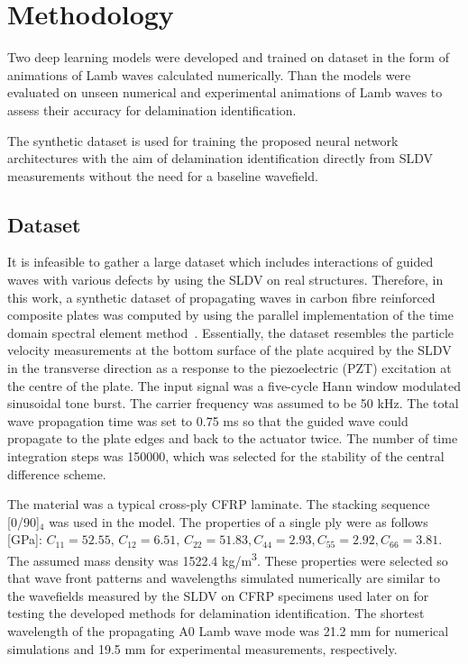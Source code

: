 \section{Methodology}
Two deep learning models were developed and trained on dataset in the form of animations of Lamb waves calculated numerically. Than the models were evaluated on unseen numerical and experimental animations of Lamb waves to assess their accuracy for delamination identification.

The synthetic dataset is used for training the proposed neural network architectures with the aim of delamination identification directly from SLDV measurements without the need for a baseline wavefield.
\subsection{Dataset}
It is infeasible to gather a large dataset which includes interactions of guided waves with various defects by using the SLDV on real structures. 
Therefore, in this work, a synthetic dataset of propagating waves in carbon fibre reinforced composite plates was computed by using the parallel implementation of the time domain spectral element method~\cite{Kudela2020}. 
Essentially, the dataset resembles the particle velocity measurements at the bottom surface of the plate acquired by the SLDV in the transverse direction as a response to the piezoelectric (PZT) excitation at the centre of the plate. 
The input signal was a five-cycle Hann window modulated sinusoidal tone burst. The carrier frequency was assumed to be 50 kHz. 
The total wave propagation time was set to 0.75 ms so that the guided wave could propagate to the plate edges and back to the actuator twice.
The number of time integration steps was 150000, which was selected for the stability of the central difference scheme.

The material was a typical cross-ply CFRP laminate. 
The stacking sequence [0/90]\(_4\) was used in the model. 
The properties of a single ply were as follows [GPa]:
\(C_{11} = 52.55, \, C_{12} = 6.51, \, C_{22} = 51.83, C_{44} = 2.93, C_{55} = 2.92, C_{66} = 3.81\). 
The assumed mass density was 1522.4 kg/m\textsuperscript{3}.
These properties were selected so that wave front patterns and wavelengths simulated numerically are similar to the wavefields measured by the SLDV on CFRP specimens used later on for testing the developed methods for delamination identification.
The shortest wavelength of the propagating A0 Lamb wave mode was 21.2 mm for numerical simulations and 19.5 mm for experimental measurements, respectively.

